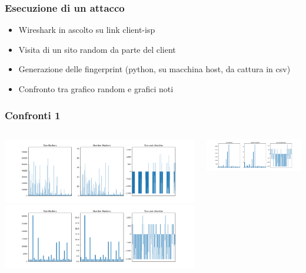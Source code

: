 \documentclass{beamer}[10pt]
\begin{document}
\begin{frame}
  \frametitle{Esecuzione di un attacco}
  \begin{itemize}
    \item Wireshark in ascolto su link client-isp
    \item Visita di un sito random da parte del client
    \item Generazione delle fingerprint (python, su macchina host, da cattura in csv)
    \item Confronto tra grafico random e grafici noti
  \end{itemize}
\end{frame}

\begin{frame}
  \frametitle{Confronti 1}
  \begin{columns}[T]
    \begin{column}{0.33\textwidth}
      \begin{center}
        \includegraphics[width=\textwidth]{../img/ansa-figure.png}
        \includegraphics[width=\textwidth]{../img/archlinux-figure.png}
      \end{center}
    \end{column}
    \begin{column}{0.33\textwidth}
      \begin{center}
        \includegraphics[width=\textwidth]{../img/facebook-figure.png}

\end{center}
\end{column}
\end{columns}
\end{frame}
\end{document}
